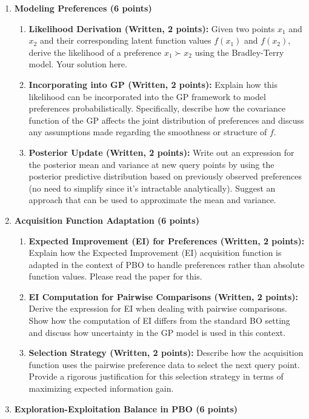 \documentclass[
  letterpaper,
  numbers=noenddot,
  DIV=11]{scrreprt}
\theoremstyle{definition}
\theoremstyle{plain}
\theoremstyle{plain}
\theoremstyle{remark}
\begin{document}
\begin{enumerate}
\def\labelenumi{(\alph{enumi})}
\item
  \textbf{Modeling Preferences (6 points)}

  \begin{enumerate}
  \def\labelenumii{(\roman{enumii})}
  \item
    \textbf{Likelihood Derivation (Written, 2 points):} Given two points
    \(x_1\) and \(x_2\) and their corresponding latent function values
    \(f(x_1)\) and \(f(x_2)\), derive the likelihood of a preference
    \(x_1 \succ x_2\) using the Bradley-Terry model. Your solution here.
  \item
    \textbf{Incorporating into GP (Written, 2 points):} Explain how this
    likelihood can be incorporated into the GP framework to model
    preferences probabilistically. Specifically, describe how the
    covariance function of the GP affects the joint distribution of
    preferences and discuss any assumptions made regarding the
    smoothness or structure of \(f\).
  \item
    \textbf{Posterior Update (Written, 2 points):} Write out an
    expression for the posterior mean and variance at new query points
    by using the posterior predictive distribution based on previously
    observed preferences (no need to simplify since it's intractable
    analytically). Suggest an approach that can be used to approximate
    the mean and variance.
  \end{enumerate}
\item
  \textbf{Acquisition Function Adaptation (6 points)}

  \begin{enumerate}
  \def\labelenumii{(\roman{enumii})}
  \item
    \textbf{Expected Improvement (EI) for Preferences (Written, 2
    points):} Explain how the Expected Improvement (EI) acquisition
    function is adapted in the context of PBO to handle preferences
    rather than absolute function values. Please read the paper for
    this.
  \item
    \textbf{EI Computation for Pairwise Comparisons (Written, 2
    points):} Derive the expression for EI when dealing with pairwise
    comparisons. Show how the computation of EI differs from the
    standard BO setting and discuss how uncertainty in the GP model is
    used in this context.
  \item
    \textbf{Selection Strategy (Written, 2 points):} Describe how the
    acquisition function uses the pairwise preference data to select the
    next query point. Provide a rigorous justification for this
    selection strategy in terms of maximizing expected information gain.
  \end{enumerate}
\item
  \textbf{Exploration-Exploitation Balance in PBO (6 points)}


\end{enumerate}
\end{document}
